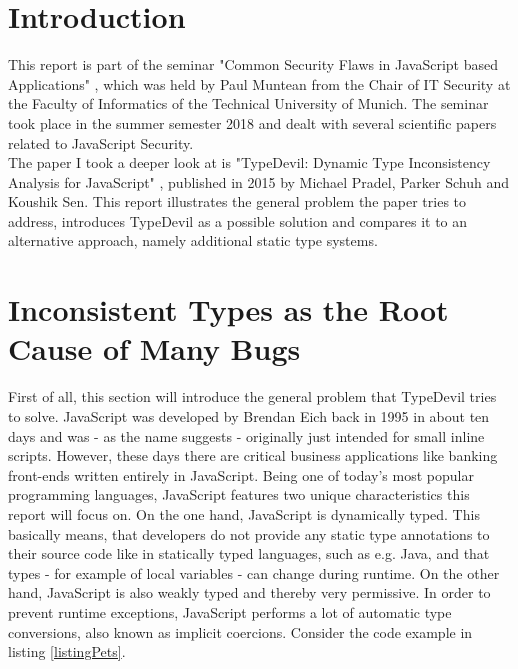 \documentclass[runningheads,a4paper]{llncs}
\begin{document}
    \newpage

\setcounter{tocdepth}{2}
\tableofcontents
\newpage

\section{Introduction}

This report is part of the seminar "Common Security Flaws in JavaScript based Applications" \cite{CommonSecFlaws}, which was held by Paul Muntean from the Chair of IT Security at the Faculty of Informatics of the Technical University of Munich.
The seminar took place in the summer semester 2018 and dealt with several scientific papers related to JavaScript Security. \\
The paper I took a deeper look at is "TypeDevil: Dynamic Type Inconsistency Analysis for JavaScript" \cite{DBLP:conf/icse/PradelSS15}, published in 2015 by Michael Pradel, Parker Schuh and Koushik Sen.
This report illustrates the general problem the paper tries to address, introduces TypeDevil as a possible solution and compares it to an alternative approach, namely additional static type systems. 

\section{Inconsistent Types as the Root Cause of Many Bugs}
First of all, this section will introduce the general problem that TypeDevil tries to solve. 
JavaScript was developed by Brendan Eich back in 1995 in about ten days and was - as the name suggests - originally just intended for small inline scripts.
However, these days there are critical business applications like banking front-ends written entirely in JavaScript. 
Being one of today's most popular programming languages, JavaScript features two unique characteristics this report will focus on. 
On the one hand, JavaScript is dynamically typed. 
This basically means, that developers do not provide any static type annotations to their source code like in statically typed languages, such as e.g. Java, and that types - for example of local variables - can change during runtime.
On the other hand, JavaScript is also weakly typed and thereby very permissive. In order to prevent runtime exceptions, JavaScript performs a lot of automatic type conversions, also known as implicit coercions.
Consider the code example in listing \ref{listingPets}. 
\end{document}
